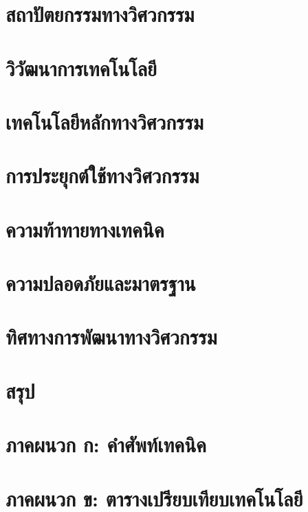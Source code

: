 \documentclass[a4paper]{article}
\begin{document}
\section{สถาปัตยกรรมทางวิศวกรรม}

\section{วิวัฒนาการเทคโนโลยี}

\section{เทคโนโลยีหลักทางวิศวกรรม}

\section{การประยุกต์ใช้ทางวิศวกรรม}

\section{ความท้าทายทางเทคนิค}

\section{ความปลอดภัยและมาตรฐาน}

\section{ทิศทางการพัฒนาทางวิศวกรรม}

\section{สรุป}

\printbibliography[title=เอกสารอ้างอิง]

\appendix
\section{ภาคผนวก ก: คำศัพท์เทคนิค}

\section{ภาคผนวก ข: ตารางเปรียบเทียบเทคโนโลยี}
\end{document}
